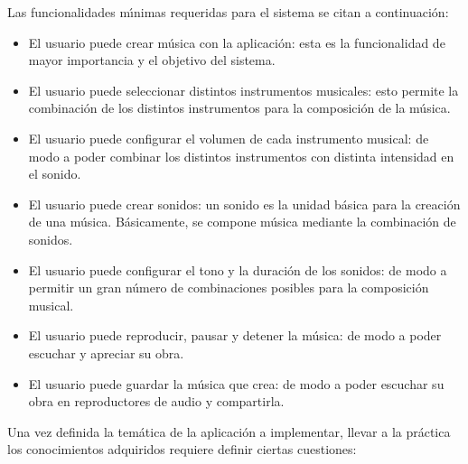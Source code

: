 Las funcionalidades m{\'\i}nimas requeridas para el sistema se citan a continuaci\'on:
\begin{itemize}
    \item El usuario puede crear m\'usica con la aplicaci\'on: esta es la funcionalidad de
    mayor importancia y el objetivo del sistema.
    \item El usuario puede seleccionar distintos instrumentos musicales: esto
    permite la combinaci\'on de los distintos instrumentos para la composici\'on de la m\'usica.
    \item El usuario puede configurar el volumen de cada instrumento musical: de
    modo a poder combinar los distintos instrumentos con distinta intensidad en el
    sonido.
    \item El usuario puede crear sonidos: un sonido es la unidad b\'asica para la
    creaci\'on de una m\'usica. B\'asicamente, se compone m\'usica mediante la combinaci\'on
    de sonidos.
    \item El usuario puede configurar el tono y la duraci\'on de los sonidos: de modo
    a permitir un gran n\'umero de combinaciones posibles para la composici\'on musical.
    \item El usuario puede reproducir, pausar y detener la m\'usica: de modo a poder
    escuchar y apreciar su obra.
    \item El usuario puede guardar la m\'usica que crea: de modo a poder escuchar
    su obra en reproductores de audio y compartirla.
\end{itemize}

Una vez definida la tem\'atica de la aplicaci\'on a implementar, llevar a la pr\'actica
los conocimientos adquiridos requiere definir ciertas cuestiones:

